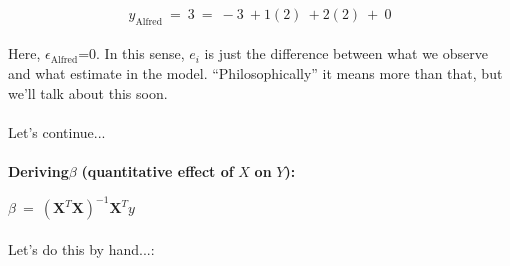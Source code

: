 \documentclass[10pt]{article}
\begin{document}
\begin{equation*}
y_{\text{Alfred}} \ =\ 3\ =\ -3\ +1( 2) \ +2( 2) \ +\ 0
\end{equation*}


\paragraph{}Here, $\displaystyle \epsilon _{\text{Alfred}}$=0. In this sense, $\displaystyle e_{i}$ is just the difference between what we observe and what estimate in the model. ``Philosophically'' it means more than that, but we'll talk about this soon.



\paragraph{}Let's continue...





\paragraph{}{\Large \textbf{Deriving}$\displaystyle \beta $\textbf{ (quantitative effect of} $\displaystyle X$ \textbf{on} $\displaystyle Y$\textbf{):}}



$\displaystyle \beta \ =\ \left( \boldsymbol{X}^{T} \boldsymbol{X}\right)^{-1} \boldsymbol{X}^{T} y$



\paragraph{}Let's do this by hand...:
\end{document}
